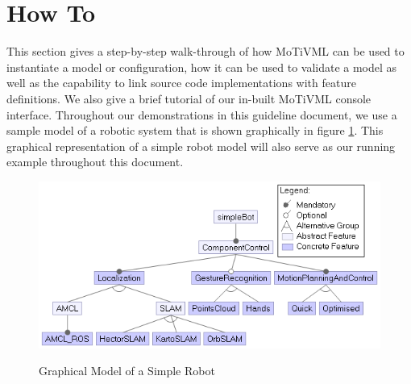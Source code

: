 \documentclass{article}
\begin{document}
\section{How To}
This section gives a step-by-step walk-through of how MoTiVML can be used to instantiate a model or configuration, how it can be used to validate a model as well as the capability to link source code implementations with feature definitions. We also give a brief tutorial of our in-built MoTiVML console interface. Throughout our demonstrations in this guideline document, we use a sample model of a robotic system that is shown graphically in figure \ref{simplebot}. This graphical representation of a simple robot model will also serve as our running example throughout this document.

\begin{figure}[H]
	\caption{Graphical Model of a Simple Robot}
	\centering
	\includegraphics[width=\columnwidth]{images/simpleBot.png}
	\label{simplebot}
\end{figure}
\end{document}
